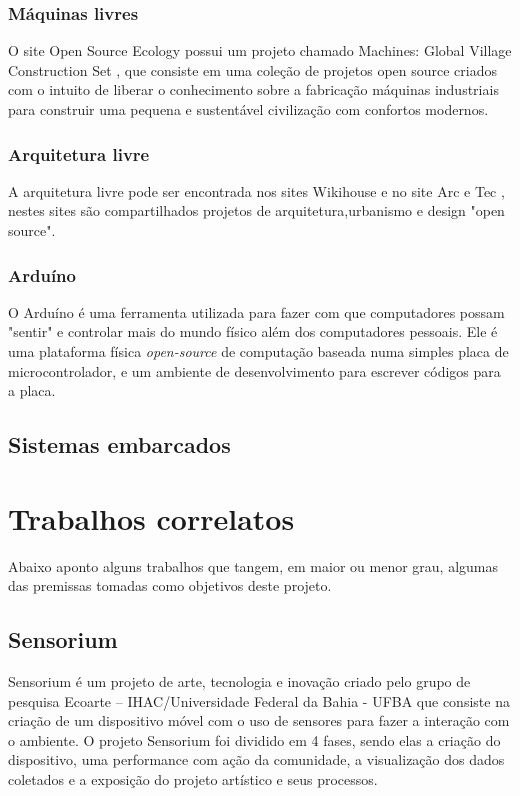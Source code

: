 \documentclass[final,12pt, times, 5p, twocolumn]{elsarticle}
\begin{document}
\subsubsection{Máquinas livres}
O site Open Source Ecology \cite{Open Source Ecology} possui um projeto chamado Machines: Global Village Construction Set \cite{Machines: Global Village Construction Set}, que consiste em uma coleção de projetos open source criados com o intuito de liberar o conhecimento sobre a fabricação máquinas industriais  para construir uma pequena e sustentável civilização com confortos modernos.

\subsubsection{Arquitetura livre}
A arquitetura livre pode ser encontrada nos sites Wikihouse \cite{Wikihouse} e no site Arc e Tec \cite{Arc e Tec}, nestes sites são compartilhados projetos de arquitetura,urbanismo e design "open source".

\subsubsection{Arduíno}
O Arduíno \cite{Arduíno} é uma ferramenta utilizada para fazer com que computadores possam "sentir" e controlar mais do mundo físico além dos computadores pessoais. Ele é uma plataforma física \textit{open-source} de computação baseada numa simples placa de microcontrolador, e um ambiente de desenvolvimento para escrever códigos para a placa.

\subsection{Sistemas embarcados}

\section{Trabalhos correlatos}
Abaixo aponto alguns trabalhos que tangem, em maior ou menor grau, algumas das premissas tomadas como objetivos deste projeto.

\subsection{Sensorium}

Sensorium é um projeto de arte, tecnologia e inovação criado pelo grupo de pesquisa Ecoarte – IHAC/Universidade Federal da Bahia - UFBA que consiste na criação de um dispositivo móvel com o uso de sensores para fazer a interação com o ambiente. O projeto Sensorium foi dividido em 4 fases, sendo elas a criação do dispositivo, uma performance com ação da comunidade, a visualização dos dados coletados e a exposição do projeto artístico e seus processos.
\end{document}
